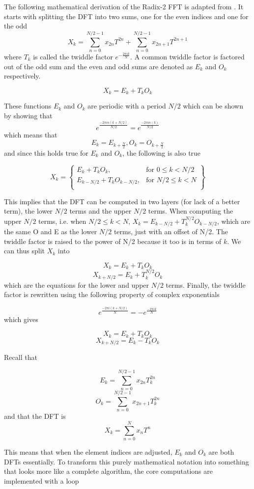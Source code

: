 The following mathematical derivation of the Radix-2 FFT is adapted from \cite{Rozman2019}. It starts with splitting the DFT into two sums, one for the even indices and one for the odd 
$$X_k = \sum^{N/2-1}_{n=0} x_{2n}T^{2n}+ \sum^{N/2-1}_{n=0} x_{2n+1}T^{2n+1}$$
where $T_k$ is called the twiddle factor $e^{-\frac{2\pi ik}{N}}$. A common twiddle factor is factored out of the odd sum and the even and odd sums are denoted as $E_k$ and $O_k$ respectively. 

$$X_k = E_k + T_kO_k$$

These functions $E_k$ and $O_k$ are periodic with a period $N/2$ which can be shown by showing that $$e^{\frac{-2\pi in(k+N/2)}{N/2}} = e^{\frac{-2\pi in(k)}{N/2}}$$
which means that 
$$E_k = E_{k+\frac{N}{2}}, O_k = O_{k+\frac{N}{2}}$$
and since this holds true for $E_k$ and $O_k$, the following is also true

\[
X_k = \left\{\begin{array}{lr}
    E_k + T_kO_k, & \text{for } 0 \leq k < N/2\\
    E_{k-N/2} + T_kO_{k-N/2}, & \text{for } N/2\leq k< N\\
    \end{array}\right\}
\]

This implies that the DFT can be computed in two layers (for lack of a better term), the lower $N/2$ terms and the upper $N/2$ terms.
When computing the upper $N/2$ terms, i.e. when $N/2 \leq k < N$, $X_k = E_{k-N/2} + T_k^{N/2}O_{k-N/2}$, which are the same O and E as the lower $N/2$ terms, just with an offset of N/2. The twiddle factor is raised to the power of N/2 because it too is in terms of $k$. We can thus split $X_k$ into 

$$X_k = E_k + T_kO_k$$  
$$X_{k+N/2} = E_k + T_k^{N/2}O_k$$
which are the equations for the lower and upper $N/2$ terms. Finally, the twiddle factor is rewritten using the following property of complex exponentials

$$e^{\frac{-2\pi i(k+N/2)}{N}} = -e^{\frac{-2\pi ik}{N}}$$
which gives

$$X_k = E_k + T_kO_k$$  
$$X_{k+N/2} = E_k - T_kO_k$$

Recall that

$$E_k = \sum^{N/2-1}_{n=0} x_{2n}T_k^{2n}$$
$$O_k = \sum^{N/2-1}_{n=0} x_{2n+1}T_k^{2n}$$
and that the DFT is
$$X_k = \sum^{N}_{n=0} x_nT^{n}$$

This means that when the element indices are adjusted, $E_k$ and $O_k$ are both DFTs essentially. To transform this purely mathematical notation into something that looks more like a complete algorithm, the core computations are implemented with a loop

